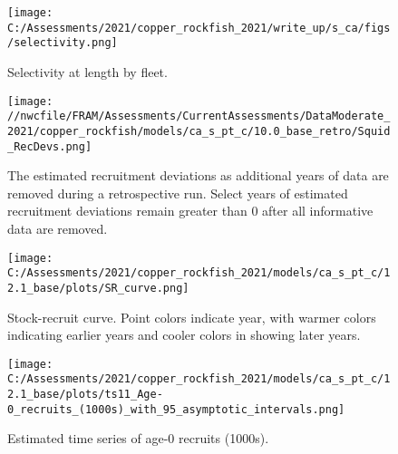 \documentclass[11pt,
  english,
  a4paper,
]{article}
\begin{document}
\tagmcend\tagstructend


\begin{figure}
\centering
\texttt{[image: C:/Assessments/2021/copper\_rockfish\_2021/write\_up/s\_ca/figs/selectivity.png]}
\caption{Selectivity at length by fleet.\label{fig:selex}}
\end{figure}

\tagmcend\tagstructend


\begin{figure}
\centering
\texttt{[image: //nwcfile/FRAM/Assessments/CurrentAssessments/DataModerate\_2021/copper\_rockfish/models/ca\_s\_pt\_c/10.0\_base\_retro/Squid\_RecDevs.png]}
\caption{The estimated recruitment deviations as additional years of data are removed during a retrospective run. Select years of estimated recruitment deviations remain greater than 0 after all informative data are removed.\label{fig:squid-rec}}
\end{figure}

\tagmcend\tagstructend


\begin{figure}
\centering
\texttt{[image: C:/Assessments/2021/copper\_rockfish\_2021/models/ca\_s\_pt\_c/12.1\_base/plots/SR\_curve.png]}
\caption{Stock-recruit curve. Point colors indicate year, with warmer colors indicating earlier years and cooler colors in showing later years.\label{fig:bh-curve}}
\end{figure}

\tagmcend\tagstructend


\begin{figure}
\centering
\texttt{[image: C:/Assessments/2021/copper\_rockfish\_2021/models/ca\_s\_pt\_c/12.1\_base/plots/ts11\_Age-0\_recruits\_(1000s)\_with\_95\_asymptotic\_intervals.png]}
\caption{Estimated time series of age-0 recruits (1000s).\label{fig:recruits}}
\end{figure}
\end{document}
